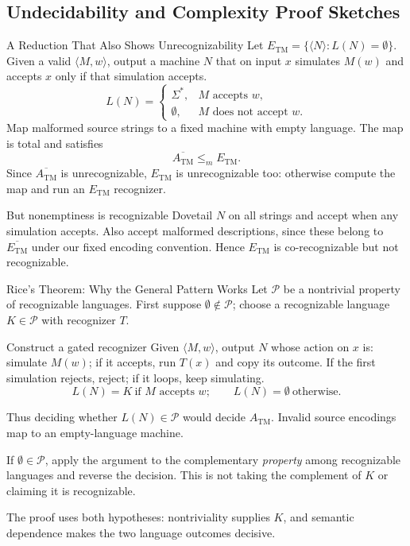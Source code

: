 \documentclass[10pt]{beamer}
\newcommand{\ATM}{A_{\mathrm{TM}}}
\newcommand{\ETM}{E_{\mathrm{TM}}}
\begin{document}
\subsection{Undecidability and Complexity Proof Sketches}

\begin{frame}{A Reduction That Also Shows Unrecognizability}
  \small
  Let $\ETM=\{\langle N\rangle:L(N)=\emptyset\}$.
  Given a valid $\langle M,w\rangle$, output a machine $N$ that on input $x$
  simulates $M(w)$ and accepts $x$ only if that simulation accepts.
  \[
    L(N)=
    \begin{cases}
      \Sigma^*,&M\text{ accepts }w,\\
      \emptyset,&M\text{ does not accept }w.
    \end{cases}
  \]
  Map malformed source strings to a fixed machine with empty language.
  The map is total and satisfies
  \[
    \overline{\ATM}\le_m\ETM.
  \]
  Since $\overline{\ATM}$ is unrecognizable, $\ETM$ is unrecognizable too:
  otherwise compute the map and run an $E_{\mathrm{TM}}$ recognizer.
  \begin{block}{But nonemptiness is recognizable}
    Dovetail $N$ on all strings and accept when any simulation accepts.
    Also accept malformed descriptions, since these belong to
    $\overline{\ETM}$ under our fixed encoding convention.
    Hence $\ETM$ is co-recognizable but not recognizable.
  \end{block}
\end{frame}

\begin{frame}{Rice's Theorem: Why the General Pattern Works}
  \small
  Let $\mathcal P$ be a nontrivial property of recognizable languages.
  First suppose $\emptyset\notin\mathcal P$; choose a recognizable
  language $K\in\mathcal P$ with recognizer $T$.
  \begin{block}{Construct a gated recognizer}
    Given $\langle M,w\rangle$, output $N$ whose action on $x$ is:
    simulate $M(w)$; if it accepts, run $T(x)$ and copy its outcome.
    If the first simulation rejects, reject; if it loops, keep simulating.
    \[
      L(N)=K\ \text{if }M\text{ accepts }w;
      \qquad L(N)=\emptyset\ \text{otherwise}.
    \]
  \end{block}
  Thus deciding whether $L(N)\in\mathcal P$ would decide $\ATM$.
  Invalid source encodings map to an empty-language machine.
  \par\smallskip
  If $\emptyset\in\mathcal P$, apply the argument to the complementary
  \emph{property} among recognizable languages and reverse the decision.
  This is not taking the complement of $K$ or claiming it is recognizable.
  \par\smallskip
  The proof uses both hypotheses: nontriviality supplies $K$, and
  semantic dependence makes the two language outcomes decisive.
\end{frame}
\end{document}

